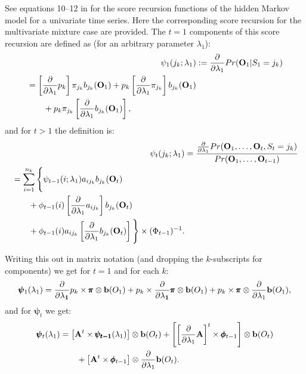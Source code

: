 \documentclass[a4paper,man,nobf]{apa}
\newcommand{\vc}{\mathbf}
\newcommand{\mat}{\mathbf}
\begin{document}
See equations 10--12  in \cite{Lys2002} for the score recursion 
functions of the hidden Markov model for a univariate time series. 
Here the corresponding score recursion for the multivariate mixture 
case are provided. The $t=1$ components of this score recursion are 
defined as (for an arbitrary parameter $\lambda_{1}$):
\begin{align}
\psi_{1}(j_{k};\lambda_{1}) &:=  \fpp Pr(\vc{O}_{1}|S_{1}=j_{k}) \\
\begin{split} 
	&= \left[  \fpp p_{k} \right] \pi_{j_{k}}b_{j_{k}}(\vc{O}_{1}) + 
	p_{k}\left[ \fpp \pi_{j_{k}} \right] b_{j_{k}}(\vc{O}_{1}) \\
	& \qquad  + p_{k}\pi_{j_{k}} \left[ \fpp 
b_{j_{k}}(\vc{O}_{1})\right],
\end{split} \label{eq:psi1}
\end{align}
and for $t>1$ the definition is:
\begin{align}
\psi_{t}(j_{k};\lambda_{1})  & =  \frac{\fpp Pr(\vc{O}_{1}, \ldots, 
\vc{O}_{t}, S_{t}=j_{k})}
			{Pr(\vc{O}_{1}, \ldots, \vc{O}_{t-1})}  \\
\begin{split} 
			 & =  %
			 \sum_{i=1}^{n_{k}} \Bigg\{ \psi_{t-1}(i;\lambda_{1})a_{ij_{k}} 
			 b_{j_{k}}(\vc{O}_{t}) \\ 
			 &\qquad +\phi_{t-1}(i) \left[ \fpp a_{ij_{k}} \right] b_{j_{k}} 
(\vc{O}_{t}) \\
			&\qquad +\phi_{t-1}(i)a_{ij_{k}}  \left[ \fpp b_{j_{k}} 
(\vc{O}_{t}) \right] \Bigg\} 
			\times (\Phi_{t-1})^{-1}.
\end{split} \label{eq:psit}
\end{align}

Writing this out in matrix notation (and dropping the $k$-subscripts 
for components) we get for $t=1$ and for each $k$:
\begin{eqnarray}
	\pmb{\psi}_{1}(\lambda_{1}) = \vc{\fpp} p_{k} \times \pmb{\pi} 
\otimes \vc{b}(O_{1})+
		p_{k} \times \vc{\fpp}\pmb{\pi} \otimes \vc{b}(O_{1}) +
		p_{k} \times \pmb{\pi} \otimes \fpp \vc{b}(O_{1}),
\end{eqnarray}
and for $\pmb{\psi}_{t}$ we get: 
\begin{equation}
\begin{split} 
	\pmb{\psi}_{t}(\lambda_{1}) 
	&= \left[ \mat{A}^{t} \times \pmb{\psi_{t-1}}(\lambda_{1})  \right ] 
\otimes \vc{b}(O_{t}) +
	\left [ \left[ \fpp \mat{A} \right ]^{t} \times \pmb{\phi}_{t-1} 
\right ] \otimes \vc{b}(O_{t}) \\
	& \qquad + \left [ \mat{A}^{t} \times \pmb{\phi}_{t-1}  \right ] 
\otimes \fpp \vc{b}(O_{t}).
\end{split} 
\end{equation}
\end{document}
